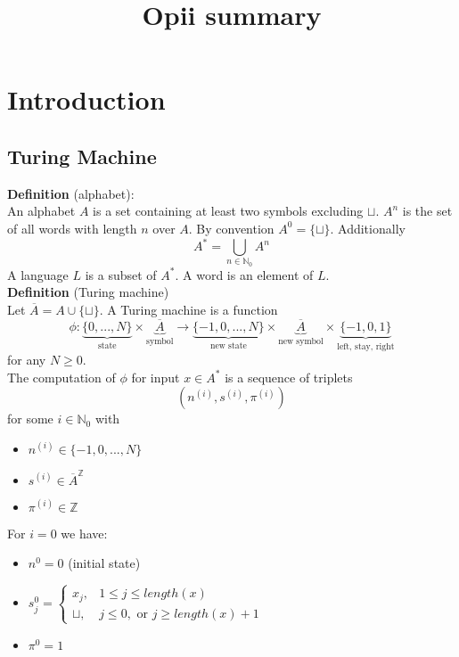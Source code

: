 \documentclass[a4paper, 12pt]{article}
\begin{document}
	\begin{titlepage} 
		\title{Opii summary}
		\clearpage\maketitle
		\thispagestyle{empty}
	\end{titlepage}
	\tableofcontents
	\section{Introduction}
	\subsection{Turing Machine}
	\textbf{Definition} (alphabet):\\
	An alphabet $A$ is a set containing at least two symbols excluding $\sqcup$. $A^n$ is the set of all words with length $n$ over $A$. By convention $A^0 = \{\sqcup\}$. Additionally \[A^* = \bigcup_{n \in \mathbb{N}_0} A^n\] A language $L$ is a subset of $A^*$. A word is an element of $L$.\\
	\textbf{Definition} (Turing machine)\\
	Let $\overline{A} = A \cup \{\sqcup\}$. A Turing machine is a function \[\phi : \underbrace{\{0,...,N\}}_{\text{state}} \times \underbrace{\overline{A}}_{\text{symbol}} \to \underbrace{\{-1, 0, ..., N\}}_{\text{new state}} \times \underbrace{\overline{A}}_{\text{new symbol}} \times \underbrace{\{-1, 0, 1\}}_{\text{left, stay, right}}\]
	for any $N \geq 0$.\\
	The computation of $\phi$ for input $x \in A^*$ is a sequence of triplets \[(n^{(i)}, s^{(i)}, \pi^{(i)})\]
	for some $i \in \mathbb{N}_0$ with \begin{itemize}
		\item $n^{(i)} \in \{-1, 0, ..., N\}$
		\item $s^{(i)} \in \overline{A}^\mathbb{Z}$
		\item $\pi^{(i)} \in \mathbb{Z}$ 
	\end{itemize}
	For $i = 0$ we have:\begin{itemize}
		\item $n^0 = 0$ (initial state)
		\item $s_j^0 = \begin{cases}
			x_j, & 1\leq j \leq length(x)\\
			\sqcup, & j \leq 0, \text{ or } j\geq length(x)+1
		\end{cases}$
		\item $\pi^0 = 1$
	\end{itemize} 
\end{document}
